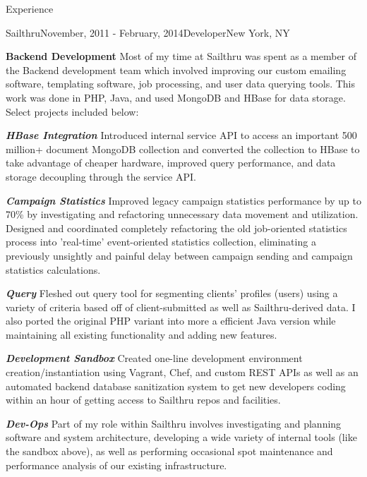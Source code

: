 \documentclass{resume} %
\begin{document}
\begin{rSection}{Experience}
    \begin{rSubsection}{Sailthru}{November, 2011 - February, 2014}{Developer}{New York, NY}
    \item \textbf{Backend Development} Most of my time at Sailthru was spent as a member of the Backend development team which involved improving our custom emailing software, templating software, job processing, and user data querying tools.  This work was done in PHP, Java, and used MongoDB and HBase for data storage.  Select projects included below:
    \item \textbf{\textit{HBase Integration}} Introduced internal service API to access an important 500 million+ document MongoDB collection and converted the collection to HBase to take advantage of cheaper hardware, improved query performance, and data storage decoupling through the service API.
    \item \textbf{\textit{Campaign Statistics}} Improved legacy campaign statistics performance by up to 70\% by investigating and refactoring unnecessary data movement and utilization. Designed and coordinated completely refactoring the old job-oriented statistics process into 'real-time' event-oriented statistics collection, eliminating a previously unsightly and painful delay between campaign sending and campaign statistics calculations.
    \item \textbf{\textit{Query}} Fleshed out query tool for segmenting clients' profiles (users) using a variety of criteria based off of client-submitted as well as Sailthru-derived data. I also ported the original PHP variant into more a efficient Java version while maintaining all existing functionality and adding new features.
    \item \textbf{\textit{Development Sandbox}} Created one-line development environment creation/instantiation using Vagrant, Chef, and custom REST APIs as well as an automated backend database sanitization system to get new developers coding within an hour of getting access to Sailthru repos and facilities.
    \item \textbf{\textit{Dev-Ops}} Part of my role within Sailthru involves investigating and planning software and system architecture, developing a wide variety of internal tools (like the sandbox above), as well as performing occasional spot maintenance and performance analysis of our existing infrastructure.
    \end{rSubsection}



\end{rSection}
\end{document}
